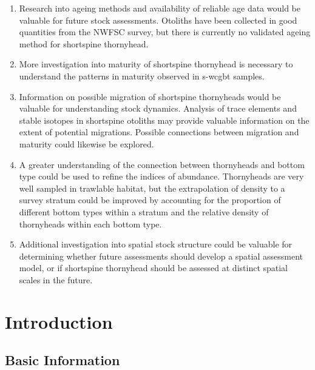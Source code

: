 \documentclass[11pt,
  english,
  letterpaper,
]{article}
\providecommand{\tightlist}{%
  \setlength{\itemsep}{0pt}\setlength{\parskip}{0pt}}
\providecommand{\tightlist}{%
  \setlength{\itemsep}{0pt}\setlength{\parskip}{0pt}}
\begin{document}
\begin{enumerate}
\def\labelenumi{\arabic{enumi}.}
\tightlist
\item
  Research into ageing methods and availability of reliable age data would be valuable for future stock assessments. Otoliths have been collected in good quantities from the NWFSC survey, but there is currently no validated ageing method for shortspine thornyhead.
\item
  More investigation into maturity of shortspine thornyhead is necessary to understand the patterns in maturity observed in \gls{s-wcgbt} samples.
\item
  Information on possible migration of shortspine thornyheads would be valuable for understanding stock dynamics. Analysis of trace elements and stable isotopes in shortspine otoliths may provide valuable information on the extent of potential migrations. Possible connections between migration and maturity could likewise be explored.
\item
  A greater understanding of the connection between thornyheads and bottom type could be used to refine the indices of abundance. Thornyheads are very well sampled in trawlable habitat, but the extrapolation of density to a survey stratum could be improved by accounting for the proportion of different bottom types within a stratum and the relative density of thornyheads within each bottom type.
\item
  Additional investigation into spatial stock structure could be valuable for determining whether future assessments should develop a spatial assessment model, or if shortspine thornyhead should be assessed at distinct spatial scales in the future.
\end{enumerate}

\pagebreak
\setlength{\parskip}{5mm plus1mm minus1mm}
\setcounter{page}{1}
\renewcommand{\thefigure}{\arabic{figure}}
\renewcommand{\thetable}{\arabic{table}}
\setcounter{table}{0}
\setcounter{figure}{0}

\hypertarget{introduction}{%
\section{Introduction}\label{introduction}}

\hypertarget{basic-information}{%
\subsection{Basic Information}\label{basic-information}}
\end{document}
